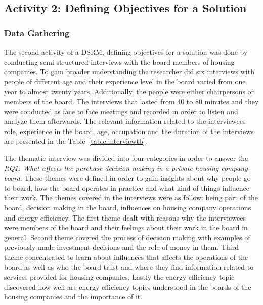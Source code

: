\subsection{Activity 2: Defining Objectives for a Solution}

\subsubsection*{Data Gathering}

The second activity of a DSRM, defining objectives for a solution was done by conducting semi-structured interviews with the board members of housing companies. To gain broader understanding the researcher did six interviews with people of different age and their experience level in the board varied from one year to almost twenty years. Additionally, the people were either chairpersons or members of the board. The interviews that lasted from 40 to 80 minutes and they were conducted as face to face meetings and recorded in order to listen and analyze them afterwards. The relevant information related to the interviewees role, experience in the board, age, occupation and the duration of the interviews are presented in the Table~\ref{table:interviewtb}.

The thematic interview was divided into four categories in order to answer the \emph{RQ1: What affects the purchase decision making in a private housing company board}. These themes were defined in order to gain insights about why people go to board, how the board operates in practice and what kind of things influence their work. The themes covered in the interviews were as follow: being part of the board, decision making in the board, influences on housing company operations and energy efficiency. The first theme dealt with reasons why the interviewees were members of the board and their feelings about their work in the board in general. Second theme covered the process of decision making with examples of previously made investment decisions and the role of money in them. Third theme concentrated to learn about influences that affects the operations of the board as well as who the board trust and where they find information related to services provided for housing companies. Lastly the energy efficiency topic discovered how well are energy efficiency topics understood in the boards of the housing companies and the importance of it.

